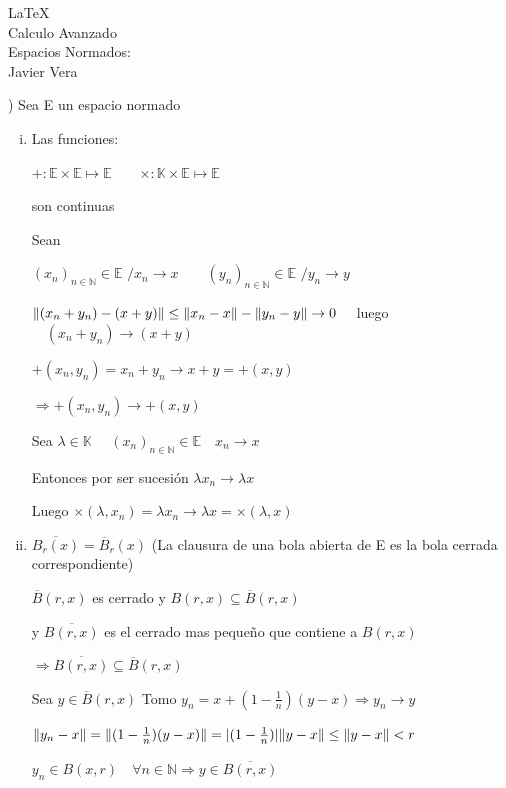 \documentclass[12pt]{article}
\newcommand{\K}{\mathbb{K}}
\newcommand{\E}{\mathbb{E}}
\newcommand{\N}{\mathbb{N}}
\newcommand{\Ra}{\Rightarrow}
\newcommand{\ra}{\rightarrow}
\newcommand{\ol}{\overline}
\DeclarePairedDelimiter{\norm}{\lVert}{\rVert}
\begin{document}
\LaTeX \\
Calculo Avanzado\\
Espacios Normados:\\
Javier Vera

\newpage
{}) Sea E un espacio normado 

\begin{enumerate}[i.]
	\item Las funciones:
		\begin{center}
		$+: \E \times \E \mapsto \E \quad \quad  \times : \K \times \E \mapsto \E$
		\end{center}
	son continuas

		Sean 

		$(x_{n})_{n \in \N} \in \E   \hspace{4pt}/ x_{n}  \ra x \quad \quad  (y_{n})_{n \in \N} \in \E  \hspace{4pt}/ y_{n} \ra y$

		$ \norm {(x_{n} + y_{n}) - (x + y)} \leq \norm {x_{n} - x} - \norm {y_{n}-y} \ra 0 \quad$ luego $\quad  (x_{n} + y_{n}) \ra (x + y)$

		$+ (x_{n},y_{n}) = x_{n} + y_{n} \ra x + y = +(x,y)$

		$\Ra +(x_{n},y_{n}) \ra +(x,y)$

		Sea $\lambda \in \K \quad$ $ (x_{n})_{n\in \N} \in \E \quad x_{n} \ra x$

		Entonces por ser sucesión $\lambda x_{n} \ra \lambda x$

		Luego $\times(\lambda,x_{n}) = \lambda x_{n} \ra \lambda x = \times (\lambda,x) $

		


	\item $\overline {B_{r}(x)} = \overline B_{r}(x)$ (La clausura de una bola abierta de E es la bola cerrada correspondiente)

		$ \overline B(r,x)$ es cerrado y $ B(r,x) \subseteq \overline B(r,x)$ 

		y $\overline {B(r,x)}$ es el cerrado mas pequeño que contiene a $B(r,x)$ 

		$\Ra \overline{B(r,x)} \subseteq \overline B(r,x)$

		Sea $y \in \ol B(r,x)$ Tomo $y_{n} = x + (1-\frac{1}{n}) (y - x) \Ra y_{n} \ra y $

		$\norm{y_{n} - x } = \norm {(1-\frac{1}{n})(y-x)} =  |(1-\frac{1}{n})| \norm {y-x } \leq \norm {y-x} < r $ 

		$ y_{n} \in B(x,r) \quad \forall n \in \N \Ra y \in \ol{B(r,x)}$


\end{enumerate}
\end{document}
